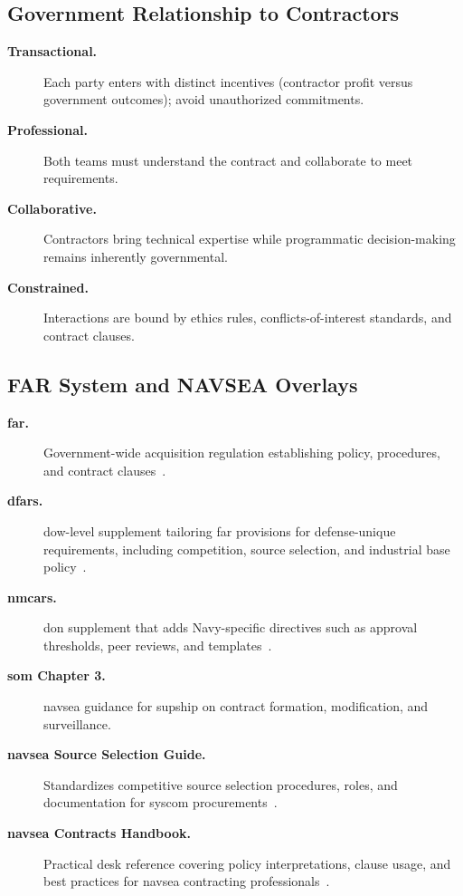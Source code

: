 \documentclass[../main.tex]{subfiles}
\begin{document}
\subsection{Government Relationship to Contractors}
\begin{description}
  \item[\textbf{Transactional.}]  Each party enters with distinct incentives (contractor profit versus government outcomes); avoid unauthorized commitments.
  \item[\textbf{Professional.}]  Both teams must understand the contract and collaborate to meet requirements.
  \item[\textbf{Collaborative.}] Contractors bring technical expertise while programmatic decision-making remains inherently governmental.
  \item[\textbf{Constrained.}]  Interactions are bound by ethics rules, conflicts-of-interest standards, and contract clauses.
\end{description}

\subsection{FAR System and NAVSEA Overlays}
\begin{description}
  \item[\textbf{\ac{far}.}] Government-wide acquisition regulation establishing policy, procedures, and contract clauses~\autocite{FAR}.
  \item[\textbf{\ac{dfars}.}] \ac{dow}-level supplement tailoring \ac{far} provisions for defense-unique requirements, including competition, source selection, and industrial base policy~\autocite{DFARS}.
  \item[\textbf{\ac{nmcars}.}] \ac{don} supplement that adds Navy-specific directives such as approval thresholds, peer reviews, and templates~\autocite{NMCARS}.
  \item[\textbf{\ac{som} Chapter 3.}] \ac{navsea} guidance for \ac{supship} on contract formation, modification, and surveillance\autocite{SOM-Ch3-2023}.
  \item[\textbf{\ac{navsea} Source Selection Guide.}] Standardizes competitive source selection procedures, roles, and documentation for \ac{syscom} procurements~\autocite{NAVSEA-Source-Selection-Guide-2022}.
  \item[\textbf{\ac{navsea} Contracts Handbook.}] Practical desk reference covering policy interpretations, clause usage, and best practices for \ac{navsea} contracting professionals~\autocite{NAVSEA-Contracts-Handbook-2023}.
\end{description}
\end{document}
